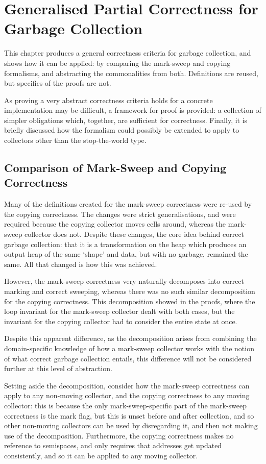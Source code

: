 \chapter{Generalised Partial Correctness for Garbage Collection}
\label{sec:gc}

This chapter produces a general correctness criteria for garbage
collection, and shows how it can be applied: by comparing the
mark-sweep and copying formalisms, and abstracting the commonalities
from both. Definitions are reused, but specifics of the proofs are
not.

As proving a very abstract correctness criteria holds for a concrete
implementation may be difficult, a framework for proof is provided: a
collection of simpler obligations which, together, are sufficient for
correctness. Finally, it is briefly discussed how the formalism could
possibly be extended to apply to collectors other than the
stop-the-world type.

\section{Comparison of Mark-Sweep and Copying Correctness}
\label{sec:gc-comparison}

Many of the definitions created for the mark-sweep correctness were
re-used by the copying correctness. The changes were strict
generalisations, and were required because the copying collector moves
cells around, whereas the mark-sweep collector does not. Despite these
changes, the core idea behind correct garbage collection: that it is
a transformation on the heap which produces an output heap of the same
`shape' and data, but with no garbage, remained the same. All that
changed is how this was achieved.

However, the mark-sweep correctness very naturally decomposes into
correct marking and correct sweeping, whereas there was no such
similar decomposition for the copying correctness. This decomposition
showed in the proofs, where the loop invariant for the mark-sweep
collector dealt with both cases, but the invariant for the copying
collector had to consider the entire state at once.

Despite this apparent difference, as the decomposition arises from
combining the domain-specific knowledge of how a mark-sweep collector
works with the notion of what correct garbage collection entails, this
difference will not be considered further at this level of
abstraction.

Setting aside the decomposition, consider how the mark-sweep
correctness can apply to any non-moving collector, and the copying
correctness to any moving collector: this is because the only
mark-sweep-specific part of the mark-sweep correctness is the mark
flag, but this is unset before and after collection, and so other
non-moving collectors can be used by disregarding it, and then not
making use of the decomposition. Furthermore, the copying correctness
makes no reference to semispaces, and only requires that addresses get
updated consistently, and so it can be applied to any moving
collector.

